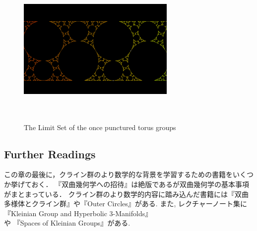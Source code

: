 \begin{figure}[htbp]
 \begin{center}
      \includegraphics[width=3in, height=3in, keepaspectratio]{../img/klein/optg.pdf}
    \caption{The Limit Set of the once punctured torus groups}
    \label{fig:opt}
 \end{center}
\end{figure}

\subsection{Further Readings}
この章の最後に，クライン群のより数学的な背景を学習するための書籍をいくつか挙げておく．
『双曲幾何学への招待』\cite{invitation}は絶版であるが双曲幾何学の基本事項がまとまっている．
クライン群のより数学的内容に踏み込んだ書籍には『双曲多様体とクライン群』\cite{manifold}や『Outer Circles』\cite{outerCircles}がある.
また, レクチャーノート集に『Kleinian Group and Hyperbolic 3-Manifolds』\cite{kleinianGroupsAndHyperbolic3-Manifolds}や
『Spaces of Kleinian Groups』\cite{space}がある.